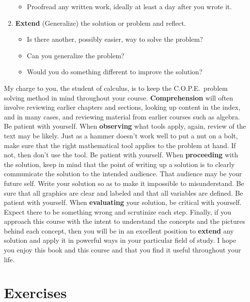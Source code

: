 \begin{enumerate}
\begin{itemize}
    \item Proofread any written work, ideally at least a day after you wrote it.
\end{itemize}
\item {\bf Extend} (Generalize) the solution or problem and reflect.
\begin{itemize}
    \item Is there another, possibly easier, way to solve the problem?
    \item Can you generalize the problem?
    \item Would you do something different to improve the solution?
\end{itemize}
\end{enumerate}

My charge to you, the student of calculus, is to keep the C.O.P.E.\ problem solving method in mind throughout your course. {\bf Comprehension} will often involve reviewing earlier chapters and sections, looking up content in the index, and in many cases, and reviewing material from earlier courses such as algebra. Be patient with yourself. When {\bf observing} what tools apply, again, review of the text may be likely. Just as a hammer doesn't work well to put a nut on a bolt, make sure that the right mathematical tool applies to the problem at hand. If not, then don't use the tool. Be patient with yourself. When {\bf proceeding} with the solution, keep in mind that the point of writing up a solution is to clearly communicate the solution to the intended audience. That audience may be your future self. Write  your solution so as to make it impossible to misunderstand. Be sure that all graphics are clear and labeled and that all variables are defined. Be patient with yourself. When {\bf evaluating} your solution, be critical with yourself. Expect there to be something wrong and scrutinize each step. Finally, if you approach this course with the intent to understand the concepts and the pictures behind each concept, then you will be in an excellent position to {\bf extend} any solution and apply it in powerful ways in your particular field of study. I hope you enjoy this book and this course and that you find it useful throughout your life.


\section{Exercises}
\label{0-3-exercises}

